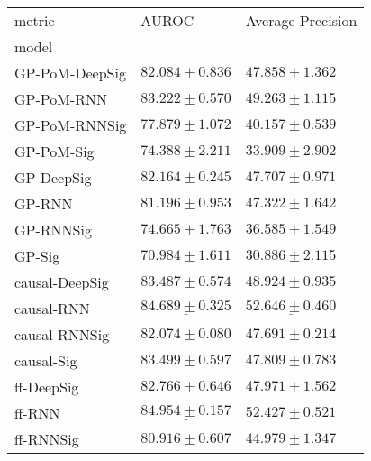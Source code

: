 \begin{tabular}{lll}
\toprule
metric &                                          AUROC &                              Average Precision \\
model          &                                                &                                                \\
\midrule
GP-PoM-DeepSig &                           $ 82.084 \pm 0.836 $ &                           $ 47.858 \pm 1.362 $ \\
GP-PoM-RNN     &                           $ 83.222 \pm 0.570 $ &                           $ 49.263 \pm 1.115 $ \\
GP-PoM-RNNSig  &                           $ 77.879 \pm 1.072 $ &                           $ 40.157 \pm 0.539 $ \\
GP-PoM-Sig     &                           $ 74.388 \pm 2.211 $ &                           $ 33.909 \pm 2.902 $ \\
GP-DeepSig     &                           $ 82.164 \pm 0.245 $ &                           $ 47.707 \pm 0.971 $ \\
GP-RNN         &                           $ 81.196 \pm 0.953 $ &                           $ 47.322 \pm 1.642 $ \\
GP-RNNSig      &                           $ 74.665 \pm 1.763 $ &                           $ 36.585 \pm 1.549 $ \\
GP-Sig         &                           $ 70.984 \pm 1.611 $ &                           $ 30.886 \pm 2.115 $ \\
causal-DeepSig &                           $ 83.487 \pm 0.574 $ &                           $ 48.924 \pm 0.935 $ \\
causal-RNN     &            $  \underline{ 84.689 \pm 0.325 } $ &  $  \mathbf{ \underline{ 52.646 \pm 0.460 }} $ \\
causal-RNNSig  &                           $ 82.074 \pm 0.080 $ &                           $ 47.691 \pm 0.214 $ \\
causal-Sig     &                           $ 83.499 \pm 0.597 $ &                           $ 47.809 \pm 0.783 $ \\
ff-DeepSig     &                           $ 82.766 \pm 0.646 $ &                           $ 47.971 \pm 1.562 $ \\
ff-RNN         &  $  \mathbf{ \underline{ 84.954 \pm 0.157 }} $ &               $  \mathbf{ 52.427 \pm 0.521 } $ \\
ff-RNNSig      &                           $ 80.916 \pm 0.607 $ &                           $ 44.979 \pm 1.347 $ \\

\end{tabular}
